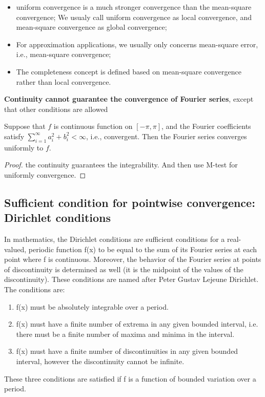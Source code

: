 \begin{refsection}
\begin{remark}\hfill
	\begin{itemize}
		\item uniform convergence is a much stronger convergence than the mean-square convergence; We usualy call uniform convergence as local convergence, and mean-square convergence as global convergence; \cite[69]{stein2011fourier}
		\item For approximation applications, we usually only concerns mean-square error, i.e., mean-square convergence;
		\item The completeness concept is defined based on mean-square convergence rather than local convergence. 
	\end{itemize}
\end{remark}

\begin{remark}
	\cite[83]{stein2011fourier} \textbf{Continuity cannot guarantee the convergence of Fourier series}, except that other conditions are allowed 
\end{remark}


\begin{lemma}
	\cite[41]{stein2011fourier} Suppose that $f$ is continuous function on $[-\pi,\pi]$, and the Fourier coefficients satisfy $\sum_{i=1}^\infty a_i^2 + b_i^2 < \infty$, i.e., convergent. Then the Fourier series converges uniformly to $f$. 
\end{lemma}
\begin{proof}
	the continuity guarantees the integrability. And then use M-test for uniformly convergence.	
\end{proof}

\subsection{Sufficient condition for pointwise convergence: Dirichlet conditions}
In mathematics, the Dirichlet conditions are sufficient conditions for a real-valued, periodic function f(x) to be equal to the sum of its Fourier series at each point where f is continuous. Moreover, the behavior of the Fourier series at points of discontinuity is determined as well (it is the midpoint of the values of the discontinuity). These conditions are named after Peter Gustav Lejeune Dirichlet.
The conditions are:
\begin{enumerate}
	\item f(x) must be absolutely integrable over a period.
	\item f(x) must have a finite number of extrema in any given bounded interval, i.e. there must be a finite number of maxima and minima in the interval.
	\item f(x) must have a finite number of discontinuities in any given bounded interval, however the discontinuity cannot be infinite.
\end{enumerate}
These three conditions are satisfied if f is a function of bounded variation over a period.\cite{wiki:Dirichlet}


\end{refsection}
